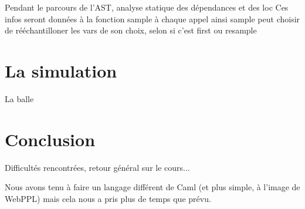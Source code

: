 \documentclass[svgnames]{article}
\begin{document}
Pendant le parcours de l'AST, analyse statique des dépendances et des loc
Ces infos seront données à la fonction sample à chaque appel
ainsi sample peut choisir de rééchantilloner les vars de son choix, selon si c'est first ou resample

\section{La simulation}

La balle

\section{Conclusion}

Difficultés rencontrées, retour général sur le cours...

Nous avons tenu à faire un langage différent de Caml (et plus simple, à l'image de WebPPL) mais cela nous a pris plus de temps que prévu.
\end{document}
